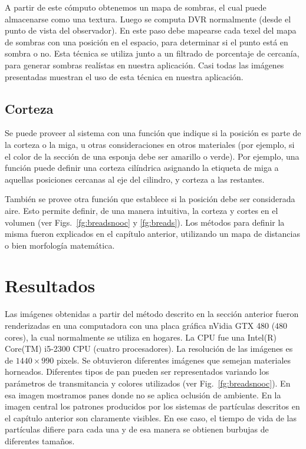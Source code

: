 A partir de este cómputo obtenemos un mapa de sombras, el cual puede almacenarse como una textura.
Luego se computa DVR normalmente (desde el punto de vista del observador).
En este paso debe mapearse cada texel del mapa de sombras con una posición en el espacio, para determinar si el punto está en sombra o no.
Esta técnica se utiliza junto a un filtrado de porcentaje de cercanía, para generar sombras realístas en nuestra aplicación.
Casi todas las imágenes presentadas muestran el uso de esta técnica en nuestra aplicación.


\subsection{Corteza}
Se puede proveer al sistema con una función que indique si la posición es parte de la corteza o la miga, u otras consideraciones en otros materiales (por ejemplo, si el color de la sección de una esponja debe ser amarillo o verde).
Por ejemplo, una función puede definir una corteza cilíndrica asignando la etiqueta de miga a aquellas posiciones cercanas al eje del cilindro, y corteza a las restantes.

También se provee otra función que establece si la posición debe ser considerada aire.
Esto permite definir, de una manera intuitiva, la corteza y cortes en el volumen (ver Figs.~\ref{fg:breadsnooc} y \ref{fg:breads}).
Los métodos para definir la misma fueron explicados en el capítulo anterior, utilizando un mapa de distancias o bien morfología matemática.


\section{Resultados}
Las imágenes obtenidas a partir del método descrito en la sección anterior fueron renderizadas en una computadora con una placa gráfica nVidia GTX 480 ($480$ cores), la cual normalmente se utiliza en hogares.
La CPU fue una Intel(R) Core(TM) i5-2300 CPU (cuatro procesadores).
La resolución de las imágenes es de $1440\times990$ pixels. 
Se obtuvieron diferentes imágenes que semejan materiales horneados.
Diferentes tipos de pan pueden ser representados variando los parámetros de transmitancia y colores utilizados (ver Fig.~\ref{fg:breadsnooc}).
En esa imagen mostramos panes donde no se aplica oclusión de ambiente.
En la imagen central los patrones producidos por los sistemas de partículas descritos en el capítulo anterior son claramente visibles.
En ese caso, el tiempo de vida de las partículas difiere para cada una y de esa manera se obtienen burbujas de diferentes tamaños.

